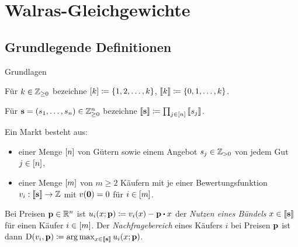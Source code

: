 \section{Walras-Gleichgewichte}
\subsection{Grundlegende Definitionen}

\begin{frame}{Grundlagen}
	\begin{notation}
		Für $k\in\mathbb{Z}_{\geq0}$ bezeichne $\left[ k \right]\coloneqq \{ 1, 2, \dots, k \}$, $\left\llbracket k \right\rrbracket\coloneqq \{0, 1, \dots, k \}$.
		
		\pause
		Für $\mathbf{s}=(s_1, \dots, s_n)\in\mathbb{Z}_{\geq0}^n$ bezeichne $\left\llbracket \mathbf{s} \right\rrbracket\coloneqq \prod_{j\in\left[ n \right]} \left\llbracket s_j \right\rrbracket$.
	\end{notation}
	
	\pause
	\begin{definition}[Markt]
		Ein Markt besteht aus:
		\begin{itemize}[label=\color{darkblue}$\bullet$]
			\item einer Menge $\left[ n \right]$ von Gütern sowie einem Angebot $s_j\in\mathbb{Z}_{>0}$ von jedem Gut $j\in\left[ n \right]$, \pause
			\item einer Menge $\left[ m \right]$ von $m\geq 2$ Käufern mit je einer Bewertungsfunktion $v_i:\left\llbracket \mathbf{s} \right\rrbracket \rightarrow \mathbb{Z}$ mit $v(\mathbf{0}) = 0$ für $i\in\left[ m \right]$.
		\end{itemize}
	\end{definition}
	\pause
	\begin{definition}[Nachfragebereich]
		Bei Preisen $\mathbf{p}\in\mathbb{R}^n$ ist $u_i(x; \fp)\coloneqq v_i(x) - \fp \bcdot x$ der \emph{Nutzen eines Bündels} $x\in\left\llbracket \mathbf{s} \right\rrbracket$ für einen Käufer $i\in\left[ m \right]$.
		\pause
		Der \emph{Nachfragebereich} eines Käufers $i$ bei Preisen $\mathbf{p}$ ist dann $\operatorname{D}(v_i, \mathbf{p})\coloneqq \arg\max_{x\in\left\llbracket \mathbf{s} \right\rrbracket} u_i(x; \mathbf{p})$.
	\end{definition}
\end{frame}

